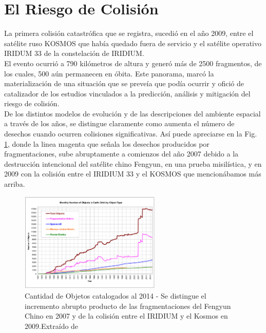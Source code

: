 \section{El Riesgo de Colisi\'on}

La primera colisi\'on catastr\'ofica que se registra, sucedi\'o en el a\~no 2009, entre el sat\'elite ruso KOSMOS  que hab\'ia quedado fuera de servicio y el sat\'elite operativo IRIDUM 33 de la constelaci\'on de IRIDIUM.\\

El evento ocurri\'o a 790 kil\'ometros de altura y gener\'o m\'as de 2500 fragmentos, de los cuales, 500 a\'un permanecen en \'obita. Este panorama, marc\'o la materializaci\'on de una situaci\'on que se preve\'ia que pod\'ia ocurrir y ofici\'o de catalizador de los estudios vinculados a la predicci\'on, an\'alisis y mitigaci\'on del riesgo de colisi\'on.\\

De los distintos modelos de evoluci\'on y de las descripciones del ambiente espacial a trav\'es de los a\~nos, se distingue claramente como aumenta el n\'umero de desechos cuando ocurren colisiones significativas. As\'i puede apreciarse en la Fig. \ref{fig:cantidad2014}, donde la linea magenta que se\~nala los desechos producidos por fragmentaciones, sube abruptamente a comienzos del a\~no 2007 debido a la destrucci\'on intencional del sat\'elite chino Fengyun, en una prueba misil\'istica, y en 2009 con la colisi\'on entre el IRIDIUM 33 y el KOSMOS que mencion\'abamos m\'as arriba.\\

\begin{figure}[!h]
  \centering
  \includegraphics[width=0.6\textwidth]{imagenes/numero2014}
  \caption[Cantidad de Objetos catalogados al 2014]{Cantidad de Objetos catalogados al 2014 - Se distingue el incremento abrupto producto de las fragmentaciones del Fengyun Chino en 2007 y de la colisi\'on entre el IRIDIUM y el Kosmos en 2009.Extra\'ido de \citep{ODQN14}}
  \label{fig:cantidad2014}
\end{figure}

